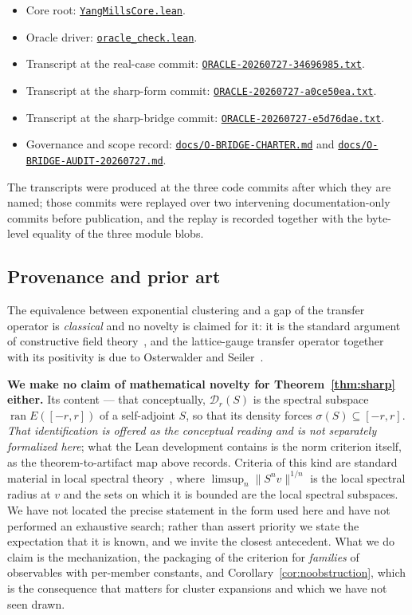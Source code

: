 \documentclass[11pt]{article}
\theoremstyle{definition}
\newcommand{\anchor}{ad9c93d793fa0b082f2373c2aea3ea5b99f9c6b8}
\newcommand{\repofile}[2]{%
  \href{https://github.com/lluiseriksson/THE-ERIKSSON-PROGRAMME/blob/\anchor/#1}{\nolinkurl{#2}}}
\begin{document}
\begin{itemize}
\item Core root:
  \repofile{YangMillsCore.lean}{YangMillsCore.lean}.
\item Oracle driver:
  \repofile{oracle\_check.lean}{oracle\_check.lean}.
\item Transcript at the real-case commit:
  \repofile{docs/oracle-transcripts/ORACLE-20260727-34696985.txt}{ORACLE-20260727-34696985.txt}.
\item Transcript at the sharp-form commit:
  \repofile{docs/oracle-transcripts/ORACLE-20260727-a0ce50ea.txt}{ORACLE-20260727-a0ce50ea.txt}.
\item Transcript at the sharp-bridge commit:
  \repofile{docs/oracle-transcripts/ORACLE-20260727-e5d76dae.txt}{ORACLE-20260727-e5d76dae.txt}.
\item Governance and scope record:
  \repofile{docs/O-BRIDGE-CHARTER.md}{docs/O-BRIDGE-CHARTER.md} and
  \repofile{docs/O-BRIDGE-AUDIT-20260727.md}{docs/O-BRIDGE-AUDIT-20260727.md}.
\end{itemize}

The transcripts were produced at the three code commits after which they
are named; those commits were replayed over two intervening
documentation-only commits before publication, and the replay is recorded
together with the byte-level equality of the three module blobs.

\subsection*{Provenance and prior art}

The equivalence between exponential clustering and a gap of the transfer
operator is \emph{classical} and no novelty is claimed for it: it is the
standard argument of constructive field
theory~\cite{GlimmJaffe,Simon}, and the lattice-gauge transfer operator
together with its positivity is due to Osterwalder and
Seiler~\cite{OsterwalderSeiler}.

\textbf{We make no claim of mathematical novelty for
Theorem~\ref{thm:sharp} either.}  Its content --- that
conceptually, $\mathcal{D}_r(S)$ is the spectral subspace
$\operatorname{ran} E([-r,r])$ of a self-adjoint $S$, so that its density
forces $\sigma(S) \subseteq [-r,r]$.  \emph{That identification is offered
as the conceptual reading and is not separately formalized here}; what the
Lean development contains is the norm criterion itself, as the
theorem-to-artifact map above records.  Criteria of this kind are standard
material in local spectral theory~\cite{LaursenNeumann}, where
$\limsup_n \|S^n v\|^{1/n}$ is the local spectral radius at $v$ and the
sets on which it is bounded are the local spectral subspaces.  We have not
located the precise statement in the form used here and have not performed
an exhaustive search; rather than assert priority we state the expectation
that it is known, and we invite the closest antecedent.  What we do claim
is the mechanization, the packaging of the criterion for \emph{families}
of observables with per-member constants, and
Corollary~\ref{cor:noobstruction}, which is the consequence that matters
for cluster expansions and which we have not seen drawn.
\end{document}

